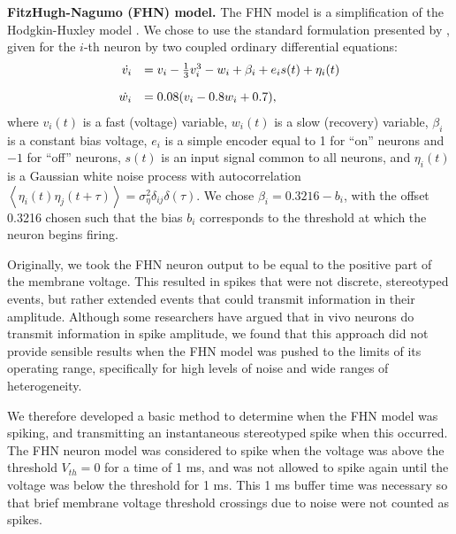 \documentclass[letterpaper,11pt]{article}
\begin{document}
\textbf{FitzHugh-Nagumo (FHN) model.} The FHN model is a simplification of the Hodgkin-Huxley model \citep{FitzHugh1961}. We chose to use the standard formulation presented by \cite{Izhikevich2006}, given for the $i$-th neuron by two coupled ordinary differential equations:
\begin{equation}
  \begin{array}{rl}
    \dot{v_i} & = v_i - \frac{1}{3}v_i^3 - w_i + \beta_i + e_i s(t) + \eta_i(t) \vspace{1em}\\
    \dot{w_i} & = 0.08(v_i - 0.8w_i + 0.7),
  \end{array}
  \label{eqn:fhn}
\end{equation}
where $v_i(t)$ is a fast (voltage) variable, $w_i(t)$ is a slow (recovery) variable, $\beta_i$ is a constant bias voltage, $e_i$ is a simple encoder equal to 1 for ``on'' neurons and $-1$ for ``off'' neurons, $s(t)$ is an input signal common to all neurons, and $\eta_i(t)$ is a Gaussian white noise process with autocorrelation $\left<\eta_i(t)\eta_j(t + \tau)\right> = \sigma_\eta^2 \delta_{ij}\delta(\tau)$. We chose $\beta_i = 0.3216 - b_i$, with the offset 0.3216 chosen such that the bias $b_i$ corresponds to the threshold at which the neuron begins firing.

Originally, we took the FHN neuron output to be equal to the positive part of the membrane voltage.
This resulted in spikes that were not discrete, stereotyped events,
but rather extended events that could transmit information in their amplitude.
Although some researchers have argued that in vivo neurons do transmit information in spike amplitude,
we found that this approach did not provide sensible results when the FHN model
was pushed to the limits of its operating range,
specifically for high levels of noise and wide ranges of heterogeneity.

We therefore developed a basic method to determine when the FHN model was spiking,
and transmitting an instantaneous stereotyped spike when this occurred.
The FHN neuron model was considered to spike
when the voltage was above the threshold $V_{th} = 0$ for a time of 1 ms,
and was not allowed to spike again until the voltage was below the threshold for 1 ms.
This 1 ms buffer time was necessary so that brief membrane voltage threshold crossings
due to noise were not counted as spikes.
\end{document}
